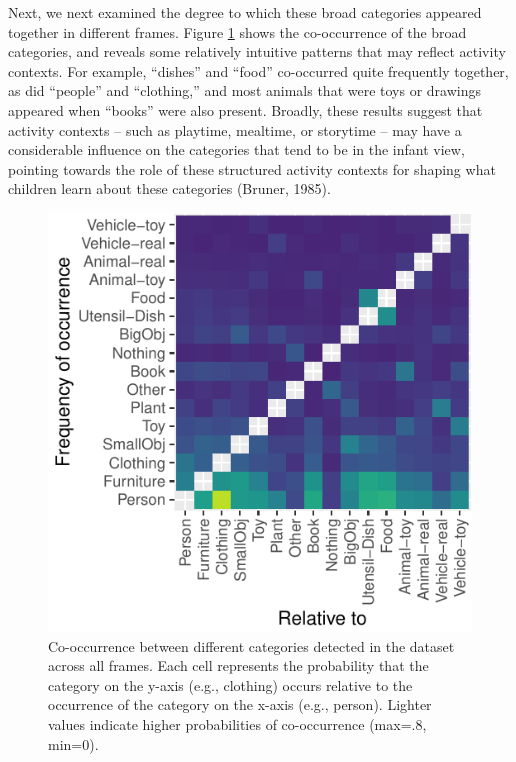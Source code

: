 \documentclass[10pt, letterpaper]{article}
\newenvironment{CodeChunk}{}{}
\begin{document}
Next, we next examined the degree to which these broad categories
appeared together in different frames. Figure \ref{fig:coocc_stats}
shows the co-occurrence of the broad categories, and reveals some
relatively intuitive patterns that may reflect activity contexts. For
example, ``dishes'' and ``food'' co-occurred quite frequently together,
as did ``people'' and ``clothing,'' and most animals that were toys or
drawings appeared when ``books'' were also present. Broadly, these
results suggest that activity contexts -- such as playtime, mealtime, or
storytime -- may have a considerable influence on the categories that
tend to be in the infant view, pointing towards the role of these
structured activity contexts for shaping what children learn about these
categories (Bruner, 1985).

\begin{CodeChunk}
\begin{figure}[h]

{\centering \includegraphics{figs/coocc_stats-1} 

}

\caption[Co-occurrence between different categories detected in the dataset across all frames]{Co-occurrence between different categories detected in the dataset across all frames. Each cell represents the probability that the category on the y-axis (e.g., clothing) occurs relative to the occurrence of the category on the x-axis (e.g., person). Lighter values indicate higher probabilities of co-occurrence (max=.8, min=0).}\label{fig:coocc_stats}
\end{figure}
\end{CodeChunk}
\end{document}

